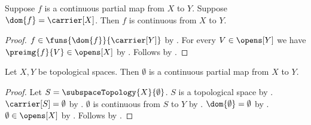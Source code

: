 \begin{theorem}\label{total_continuous_partial_map}
    Suppose $f$ is a continuous partial map from $X$ to $Y$.
    Suppose $\dom{f}=\carrier[X]$.
    Then $f$ is continuous from $X$ to $Y$.
\end{theorem}
\begin{proof}
    $f\in\funs{\dom{f}}{\carrier[Y]}$ by .
    For every $V\in\opens[Y]$ we have $\preimg{f}{V}\in\opens[X]$ by
        .
    Follows by .
\end{proof}

\begin{theorem}\label{empty_continuous_partial_map}
    Let $X,Y$ be topological spaces.
    Then $\emptyset$ is a continuous partial map from $X$ to $Y$.
\end{theorem}
\begin{proof}
    Let $S=\subspaceTopology{X}{\emptyset}$.
    $S$ is a topological space by .
    $\carrier[S]=\emptyset$ by
        .
    $\emptyset$ is continuous from $S$ to $Y$ by .
    $\dom{\emptyset}=\emptyset$ by .
    $\emptyset\in\opens[X]$ by .
    Follows by .
\end{proof}
